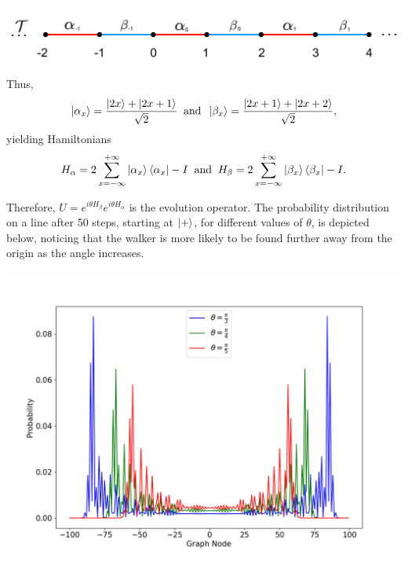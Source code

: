 \begin{center}
	\includegraphics[scale=0.30]{img/tesselation.png}
\end{center}
Thus, 
\begin{equation}
	\ket{\alpha_x} = \frac{\ket{2x} + \ket{2x+1}}{\sqrt{2}}\; \; \text{and}\; \; \ket{\beta_x} = \frac{\ket{2x+1}+\ket{2x+2}}{\sqrt{2}},
\end{equation}
yielding Hamiltonians 
\begin{equation}
	H_\alpha = 2\sum_{x=-\infty}^{+\infty}\ket{\alpha_{x}}\bra{\alpha_x} - I \; \; \text{and}\; \;  H_\beta = 2\sum_{x=-\infty}^{+\infty}\ket{\beta_{x}}\bra{\beta_x} - I.
\end{equation}

Therefore, $U = e^{i\theta H_\beta}e^{i\theta H_\alpha}$ is the  evolution operator. The probability
distribution  on a line after 50 steps, starting at $\ket{+}$, for different values of $\theta$, is depicted below,    
noticing that the walker is more likely to be found further away from the origin
as the angle increases.
\begin{center}
\includegraphics[scale=0.30]{img/stagqwMultiple.png}
\end{center}


